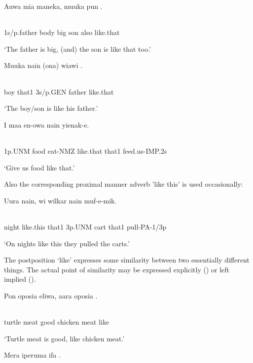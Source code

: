 \ea%
\label{ex:x1338}
\gll Auwa  mia  maneka,  muuka  pun  . \\
      \\
\glt
\z

1s/p.father  body  big  son  also  like.that

`The father is big, (and) the son is like that too.'

\ea%
\label{ex:x1339}
\gll Muuka  nain  (ona)  wiawi  . \\
      \\
\glt
\z

boy  that1  3s/p.GEN  father  like.that

`The boy/son is like his father.'

\ea%
\label{ex:x1348}
\gll I  maa  en-owa    nain  yienak-e. \\
      \\
\glt
\z

1p.UNM  food  eat-NMZ  like.that  that1  feed.us-IMP.2s

`Give us food like that.'

Also the corresponding proximal manner adverb  'like this' is used occasionally:

\ea%
\label{ex:x1347}
\gll Uura    nain,  wi  wilkar  nain  muf-e-mik. \\
      \\
\glt
\z

night  like.this  that1  3p.UNM  cart  that1  pull-PA-1/3p

`On nights like this they pulled the carts.'

The postposition  `like' expresses some similarity between two essentially different things. The actual point of similarity may be expressed explicitly () or left implied ().

\ea%
\label{ex:x1341}
\gll Pon  oposia  eliwa,  aara  oposia  . \\
      \\
\glt
\z

turtle  meat  good  chicken  meat  like

`Turtle meat is good, like chicken meat.'

\ea%
\label{ex:x1340}
\gll Mera  iperuma  ifa  . \\
      \\
\glt
\z

